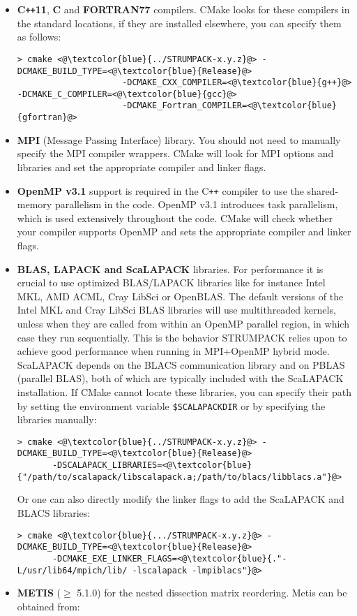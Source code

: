\documentclass{article}
\newcommand{\tm}{\textsuperscript{\textregistered}}
\begin{document}
\begin{itemize}
\item \textbf{C\texttt{++}11}, \textbf{C} and \textbf{FORTRAN77}
  compilers. CMake looks for these compilers in the standard
  locations, if they are installed elsewhere, you can specify them as
  follows:
  \begin{lstlisting}[style=Bash]
    > cmake <@\textcolor{blue}{../STRUMPACK-x.y.z}@> -DCMAKE_BUILD_TYPE=<@\textcolor{blue}{Release}@>
                     -DCMAKE_CXX_COMPILER=<@\textcolor{blue}{g++}@> -DCMAKE_C_COMPILER=<@\textcolor{blue}{gcc}@>
                     -DCMAKE_Fortran_COMPILER=<@\textcolor{blue}{gfortran}@>
  \end{lstlisting}
\item \textbf{MPI} (Message Passing Interface) library.  You should
  not need to manually specify the MPI compiler wrappers.  CMake will
  look for MPI options and libraries and set the appropriate compiler
  and linker flags.
\item \textbf{OpenMP v3.1} support is required in the C\texttt{++}
  compiler to use the shared-memory parallelism in the code. OpenMP
  v3.1 introduces task parallelism, which is used extensively
  throughout the code. CMake will check whether your compiler supports
  OpenMP and sets the appropriate compiler and linker flags.
\item \textbf{BLAS, LAPACK and ScaLAPACK} libraries. For performance
  it is crucial to use optimized BLAS/LAPACK libraries like for
  instance Intel\tm{} MKL, AMD\tm{} ACML, Cray\tm{} LibSci or
  OpenBLAS. The default versions of the Intel\tm{} MKL and Cray\tm{}
  LibSci BLAS libraries will use multithreaded kernels, unless when
  they are called from within an OpenMP parallel region, in which case
  they run sequentially. This is the behavior STRUMPACK relies upon to
  achieve good performance when running in MPI+OpenMP hybrid
  mode. ScaLAPACK depends on the BLACS communication library and on
  PBLAS (parallel BLAS), both of which are typically included with the
  ScaLAPACK installation. If CMake cannot locate these libraries, you
  can specify their path by setting the environment variable
  \lstinline[style=Bash]!$SCALAPACKDIR! or by specifying the libraries
  manually:
  \begin{lstlisting}[style=Bash]
    > cmake <@\textcolor{blue}{../STRUMPACK-x.y.z}@> -DCMAKE_BUILD_TYPE=<@\textcolor{blue}{Release}@>
       -DSCALAPACK_LIBRARIES=<@\textcolor{blue}{"/path/to/scalapack/libscalapack.a;/path/to/blacs/libblacs.a"}@>
  \end{lstlisting}
  Or one can also directly modify the linker flags to add the
  ScaLAPACK and BLACS libraries:
  \begin{lstlisting}[style=Bash]
    > cmake <@\textcolor{blue}{.../STRUMPACK-x.y.z}@> -DCMAKE_BUILD_TYPE=<@\textcolor{blue}{Release}@>
       -DCMAKE_EXE_LINKER_FLAGS=<@\textcolor{blue}{."-L/usr/lib64/mpich/lib/ -lscalapack -lmpiblacs"}@>
  \end{lstlisting}
\item \textbf{METIS} ($\geq$ 5.1.0) for the nested dissection matrix
  reordering. Metis can be obtained from:


\end{itemize}
\end{document}
